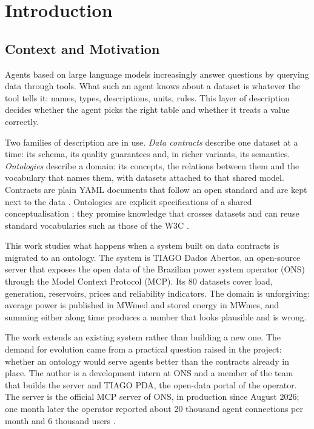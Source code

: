 \chapter{Introduction}

\section{Context and Motivation}
Agents based on large language models increasingly answer questions by querying data through
tools. What such an agent knows about a dataset is whatever the tool tells it: names, types,
descriptions, units, rules. This layer of description decides whether the agent picks the
right table and whether it treats a value correctly.

Two families of description are in use. \emph{Data contracts} describe one dataset at a
time: its schema, its quality guarantees and, in richer variants, its semantics.
\emph{Ontologies} describe a domain: its concepts, the relations between them and the
vocabulary that names them, with datasets attached to that shared model. Contracts are
plain YAML documents that follow an open standard and are kept next to the data
\cite{odcs2026}. Ontologies are explicit specifications of a shared conceptualisation
\cite{gruber1993translation,studer1998knowledge}; they promise knowledge that crosses
datasets and can reuse standard vocabularies such as those of the W3C \cite{dcat3,skos2009}.

This work studies what happens when a system built on data contracts is migrated to an
ontology. The system is TIAGO Dados Abertos, an open-source server that exposes the open
data of the Brazilian power system operator (ONS) through the Model Context Protocol (MCP).
Its 80 datasets cover load, generation, reservoirs, prices and reliability indicators. The
domain is unforgiving: average power is published in MWmed and stored energy in MWmes, and
summing either along time produces a number that looks plausible and is wrong.

The work extends an existing system rather than building a new one. The demand for
evolution came from a practical question raised in the project: whether an ontology would
serve agents better than the contracts already in place. The author is a development intern
at ONS and a member of the team that builds the server and TIAGO PDA, the open-data portal
of the operator. The server is the official MCP server of ONS, in production since August
2026; one month later the operator reported about 20 thousand agent connections per month
and 6 thousand users \cite{baguete2026ons}.


